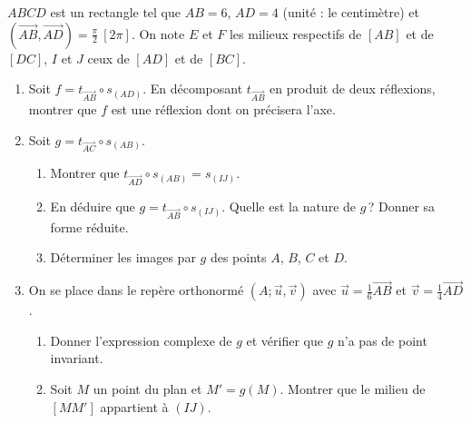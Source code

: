 \begin{exo}\label{exo:isom-symetrie-glissee}
      $ABCD$ est un rectangle tel que $AB = 6$, $AD = 4$ (unité : le centimètre) et
      $(\overrightarrow{AB},\overrightarrow{AD}) = \frac{\pi}{2}\ [2\pi]$.
      On note $E$ et $F$ les milieux respectifs de $[AB]$ et de $[DC]$, $I$ et $J$ ceux de $[AD]$ et de $[BC]$.
      \begin{enumerate}
            \item Soit $f = t_{\overrightarrow{AB}} \circ s_{(AD)}$.
                  En décomposant $t_{\overrightarrow{AB}}$ en produit de deux réflexions, montrer que $f$ est une réflexion dont on précisera l'axe.
            \item Soit $g = t_{\overrightarrow{AC}} \circ s_{(AB)}$.
                  \begin{enumerate}
                        \item Montrer que $t_{\overrightarrow{AD}} \circ s_{(AB)} = s_{(IJ)}$.
                        \item En déduire que $g = t_{\overrightarrow{AB}} \circ s_{(IJ)}$.
                              Quelle est la nature de $g$\,? Donner sa forme réduite.
                        \item Déterminer les images par $g$ des points $A$, $B$, $C$ et $D$.
                  \end{enumerate}
            \item On se place dans le repère orthonormé $(A;\vec{u},\vec{v})$ avec $\vec{u} = \frac{1}{6}\overrightarrow{AB}$
                  et $\vec{v} = \frac{1}{4}\overrightarrow{AD}$.
                  \begin{enumerate}
                        \item Donner l'expression complexe de $g$ et vérifier que $g$ n'a pas de point invariant.
                        \item Soit $M$ un point du plan et $M' = g(M)$. Montrer que le milieu de $[MM']$ appartient à $(IJ)$.
                  \end{enumerate}
      \end{enumerate}
\end{exo}
